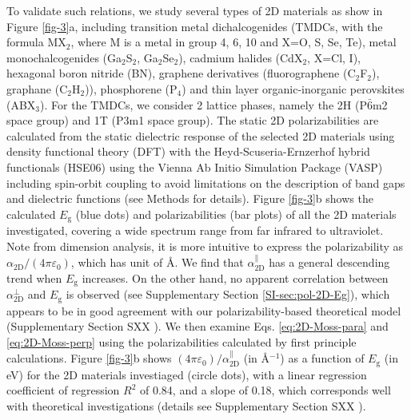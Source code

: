 \documentclass[journal=ancac3,manuscript=article,email=true,hyperref=true,keywords=false]{achemso}
\begin{document}
To validate such relations, we study several types of 2D materials as
show in Figure \ref{fig-3}a, including transition metal
dichalcogenides (TMDCs, with the formula MX\(_{\text{2}}\), where M is
a metal in group 4, 6, 10 and X=O, S, Se, Te), metal monochalcogenides
(Ga$_{2}$S$_{2}$, Ga$_{2}$Se$_{2}$), cadmium halides (CdX$_2$, X=Cl,
I), hexagonal boron nitride (BN), graphene derivatives (fluorographene
(C$_{2}$F$_{2}$), graphane (C$_{2}$H$_{2}$)), phosphorene (P$_{4}$)
and thin layer organic-inorganic perovskites (ABX$_{3}$).  For the
TMDCs, we consider 2 lattice phases, namely the 2H (P\(\bar{6}\)m2
space group) and 1T (P3m1 space group).  The static 2D
polarizabilities are calculated from the static dielectric response of
the selected 2D materials using density functional theory (DFT) with
the Heyd-Scuseria-Ernzerhof hybrid functionals (HSE06) using the
Vienna Ab Initio Simulation Package (VASP) including spin-orbit
coupling to avoid limitations on the description of band gaps and
dielectric functions (see Methods for details). Figure \ref{fig-3}b
shows the calculated $E_{\mathrm{g}}$ (blue dots) and polarizabilities
(bar plots) of all the 2D materials investigated, covering a wide
spectrum range from far infrared to ultraviolet. Note from dimension
analysis, it is more intuitive to express the polarizability as
$\alpha_{\mathrm{2D}}/(4 \pi \varepsilon_{0})$, which has unit of
\AA. We find that $\alpha_{\mathrm{2D}}^{\parallel}$ has a general
descending trend when $E_{\mathrm{g}}$ increases. On the other hand,
no apparent correlation between $\alpha_{\mathrm{2D}}^{\perp}$ and
$E_{\mathrm{g}}$ is observed (see Supplementary Section
\ref{SI-sec:pol-2D-Eg}), which appears to be in good agreement with
our polarizability-based theoretical model (Supplementary Section SXX
). We then examine Eqs. \ref{eq:2D-Moss-para} and
\ref{eq:2D-Moss-perp} using the polarizabilities calculated by first
principle calculations. Figure \ref{fig-3}b shows
$(4 \pi \varepsilon_{0})/\alpha_{\mathrm{2D}}^{\parallel}$ (in
\AA{}$^{-1}$) as a function of $E_{\mathrm{g}}$ (in eV) for the 2D
materials investiaged (circle dots), with a linear regression
coefficient of regression $R^{2}$ of 0.84, and a slope of 0.18, which
corresponds well with theoretical investigations (details see
Supplementary Section SXX ).
\end{document}
